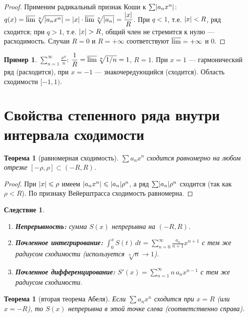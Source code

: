 \documentclass[11pt,a4paper]{article}
\theoremstyle{definition}
\newtheorem{example}[definition]{Пример}
\theoremstyle{plain}
\newtheorem{theorem}[definition]{Теорема}
\newtheorem{corollary}[definition]{Следствие}
\newcommand{\dt}{\,dt}
\renewcommand{\le}{\leqslant}
\DeclarePairedDelimiter{\abs}{\lvert}{\rvert}
\begin{document}
\begin{proof}
Применим радикальный признак Коши к $\sum\abs{a_n x^n}$:
$q(x)=\varlimsup\sqrt[n]{\abs{a_n x^n}}=\abs x\cdot\varlimsup\sqrt[n]{\abs{a_n}}=\dfrac{\abs x}{R}$.
При $q<1$, т.е. $\abs x<R$, ряд сходится; при $q>1$, т.е. $\abs x>R$, общий член не стремится к
нулю — расходимость. Случаи $R=0$ и $R=+\infty$ соответствуют $\varlimsup=+\infty$ и $0$.
\end{proof}

\begin{example}
$\displaystyle\sum_{n=1}^\infty\frac{x^n}{n}$: $\dfrac1R=\varlimsup\sqrt[n]{1/n}=1$, $R=1$. При
$x=1$ — гармонический ряд (расходится), при $x=-1$ — знакочередующийся (сходится). Область
сходимости $[-1,1)$.
\end{example}

\section{Свойства степенного ряда внутри интервала сходимости}

\begin{theorem}[равномерная сходимость]
$\sum a_n x^n$ сходится равномерно на любом отрезке $[-\rho,\rho]\subset(-R,R)$.
\end{theorem}

\begin{proof}
При $\abs x\le\rho$ имеем $\abs{a_n x^n}\le\abs{a_n}\rho^n$, а ряд $\sum\abs{a_n}\rho^n$ сходится
(так как $\rho<R$). По признаку Вейерштрасса сходимость равномерна.
\end{proof}

\begin{corollary}\leavevmode
\begin{enumerate}[label=\arabic*),leftmargin=*]
  \item \textbf{Непрерывность:} сумма $S(x)$ непрерывна на $(-R,R)$.
  \item \textbf{Почленное интегрирование:}
        $\displaystyle\int_0^x S(t)\dt=\sum_{n=0}^\infty\frac{a_n}{n+1}x^{n+1}$ с тем же радиусом
        сходимости (используется $\sqrt[n]{n}\to1$).
  \item \textbf{Почленное дифференцирование:}
        $\displaystyle S'(x)=\sum_{n=1}^\infty n\,a_n x^{n-1}$ с тем же радиусом сходимости.
\end{enumerate}
\end{corollary}

\begin{theorem}[вторая теорема Абеля]
Если $\sum a_n x^n$ сходится при $x=R$ (или $x=-R$), то $S(x)$ непрерывна в этой точке слева
(соответственно справа).
\end{theorem}
\end{document}
